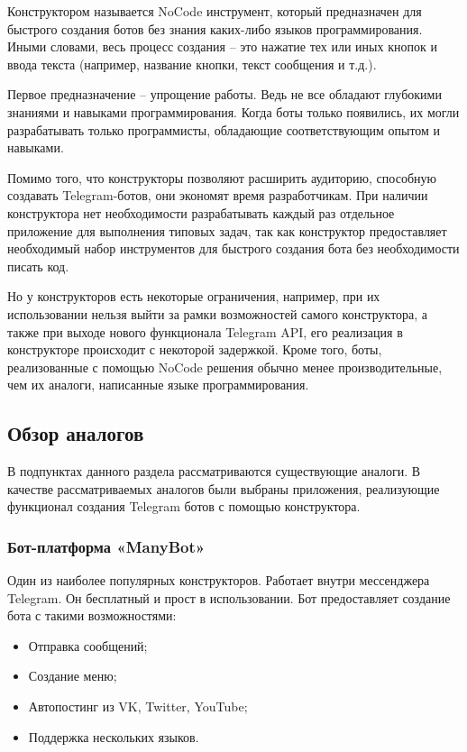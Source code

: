 Конструктором называется NoCode инструмент, который
предназначен для
быстрого создания ботов без знания каких-либо языков программирования.
Иными словами, весь процесс создания – это нажатие тех или иных кнопок и
ввода текста (например, название кнопки, текст сообщения и т.д.).

Первое предназначение – упрощение работы. Ведь не все обладают
глубокими знаниями и навыками программирования. Когда боты только
появились, их могли разрабатывать только программисты, обладающие
соответствующим опытом и навыками.

Помимо того, что конструкторы позволяют расширить аудиторию,
способную создавать Telegram-ботов, они экономят время разработчикам. При
наличии конструктора нет необходимости разрабатывать каждый раз
отдельное приложение для выполнения типовых
задач, так как конструктор предоставляет необходимый
набор инструментов для быстрого создания бота
без необходимости писать код.

Но у конструкторов есть некоторые ограничения, например, при их
использовании нельзя выйти за рамки возможностей самого конструктора, а
также при выходе нового функционала Telegram API, его реализация в
конструкторе происходит с некоторой задержкой. Кроме того, боты,
реализованные с помощью NoCode решения обычно менее производительные,
чем их аналоги, написанные языке программирования.



\subsection{Обзор аналогов}

В подпунктах данного раздела рассматриваются существующие аналоги.
В качестве рассматриваемых аналогов были выбраны приложения,
реализующие функционал создания Telegram ботов с помощью конструктора.


\subsubsection{Бот-платформа «ManyBot»}


Один из наиболее популярных конструкторов. Работает внутри мессенджера Telegram.
Он бесплатный и прост в использовании.
Бот предоставляет создание бота с такими возможностями:
\begin{itemize}
	\item Отправка сообщений;
	\item Создание меню;
	\item Автопостинг из VK, Twitter, YouTube;
	\item Поддержка нескольких языков.
\end{itemize}

